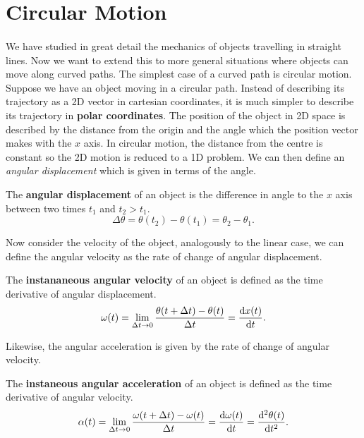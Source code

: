 \documentclass[../classical_mechanics.tex]{subfiles}
\begin{document}
    \section{Circular Motion}
        \paragraph{}
        We have studied in great detail the mechanics of objects travelling in straight lines.
        Now we want to extend this to more general situations where objects can move along curved paths.
        The simplest case of a curved path is circular motion.
        Suppose we have an object moving in a circular path.
        Instead of describing its trajectory as a 2D vector in cartesian coordinates, it is much simpler to describe its trajectory in \textbf{polar coordinates}.
        The position of the object in 2D space is described by the distance from the origin and the angle which the position vector makes with the $x$ axis.
        In circular motion, the distance from the centre is constant so the 2D motion is reduced to a 1D problem.
        We can then define an \textit{angular displacement} which is given in terms of the angle.
        \begin{definition}
            The \textbf{angular displacement} of an object is the difference in angle to the $x$ axis between two times $t_1$ and $t_2>t_1$.
            \begin{equation}
                \Delta\theta=\theta(t_2)-\theta(t_1)=\theta_2-\theta_1.
            \end{equation}
        \end{definition}
        Now consider the velocity of the object, analogously to the linear case, we can define the angular velocity as the rate of change of angular displacement.
        \begin{definition}
            The \textbf{instananeous angular velocity} of an object is defined as the time derivative of angular displacement.
            \begin{equation}
                \omega(t)=\lim_{\Delta t\to0}\frac{\theta(t+\Delta t)-\theta(t)}{\Delta t}=\dv{x(t)}{t}.
            \end{equation}
        \end{definition}
        Likewise, the angular acceleration is given by the rate of change of angular velocity.
        \begin{definition}
            The \textbf{instaneous angular acceleration} of an object is defined as the time derivative of angular velocity.
            \begin{equation}
                \alpha(t)=\lim_{\Delta t\to0}\frac{\omega(t+\Delta t)-\omega(t)}{\Delta t}=\dv{\omega(t)}{t}=\dv[2]{\theta(t)}{t}.
            \end{equation}
        \end{definition}
\end{document}
